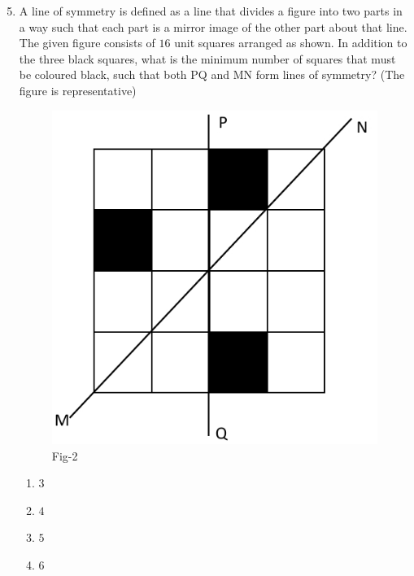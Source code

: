 \documentclass[journal]{IEEEtran}
\theoremstyle{remark}
\begin{document}
\begin{enumerate}[itemsep=1em]
\setcounter{enumi}{4}
\item A line of symmetry is defined as a line that divides a figure into two parts in a way such that each part is a mirror image of the other part about that line. \\ 
The given figure consists of $16$ unit squares arranged as shown. In addition to the three black squares, what is the minimum number of squares that must be coloured black, such that both PQ and MN form lines of symmetry?                        (The figure is representative) 
\begin{figure}[H]
    \centering
    \includegraphics[width=0.4\columnwidth]{figs/fig-2.jpeg}
    \caption*{Fig-2}
    \label{fig-2}
\end{figure}
\begin{multicols}{4}
\begin{enumerate}
      \item $3$
      \item $4$
      \item $5$
      \item $6$
\end{enumerate}
\end{multicols}
\end{enumerate}

\newpage
\vspace*{0.25cm}
\end{document}
